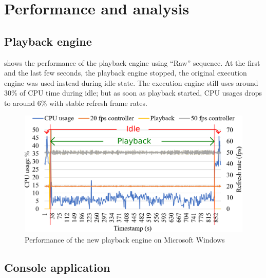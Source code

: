 \chapter{Performance and analysis}
\renewcommand{\baselinestretch}{\mystretch}
\label{chap:Perf}

 

\section{Playback engine}

 shows the performance of the  playback engine  using  ``Raw'' sequence. At the first and the last few seconds, the playback engine stopped, the original execution engine was used instead during idle state. The execution engine still uses around $30 \%$ of CPU time during idle; but as soon as playback started, CPU usages drops to around $6 \%$ with stable refresh frame rates. 

\begin{figure}[t]
  \centering
  \includegraphics[width=0.8\columnwidth]{Figs/playback.eps}
  \caption{\footnotesize Performance of the new playback engine on Microsoft Windows}
  \label{fig:playback}
\end{figure}

\section{Console application}


